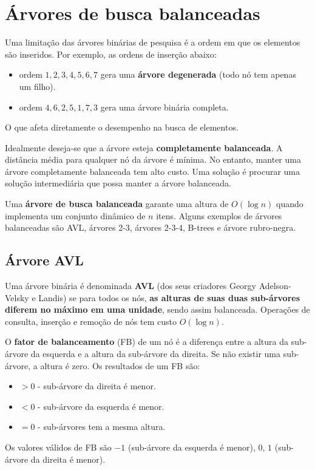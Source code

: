 \section{Árvores de busca balanceadas}

Uma limitação das árvores binárias de pesquisa é a ordem em que os elementos
são inseridos. Por exemplo, as ordens de inserção abaixo:
\begin{itemize}
\item ordem $1, 2, 3, 4, 5, 6, 7$ gera uma {\bf árvore degenerada} (todo nó
tem apenas um filho).
\item ordem $4, 6, 2, 5, 1, 7, 3$ gera uma árvore binária completa.
\end{itemize}
O que afeta diretamente o desempenho na busca de elementos.

Idealmente deseja-se que a árvore esteja {\bf completamente balanceada}.
A distância média para qualquer nó da árvore é mínima.
No entanto, manter uma árvore completamente balanceada tem alto custo.
Uma solução é procurar uma solução intermediária que possa manter a árvore
balanceada.

Uma {\bf árvore de busca balanceada} garante uma altura de $O(\log n)$
quando implementa um conjunto dinâmico de $n$ itens.
Alguns exemplos de árvores balanceadas são AVL, árvores 2-3, árvores 2-3-4,
B-trees e árvore rubro-negra.

\subsection{Árvore AVL}

Uma árvore binária é denominada {\bf AVL} (dos seus criadores Georgy
Adelson-Velsky e Landis) se para todos os nós, {\bf as alturas de suas duas
sub-árvores diferem no máximo em uma unidade}, sendo assim balanceada.
Operações de consulta, inserção e remoção de nós tem custo $O(\log n)$.

O {\bf fator de balanceamento} (FB) de um nó é a diferença entre
a altura da sub-árvore da esquerda e a altura da sub-árvore da direita.
Se não existir uma sub-árvore, a altura é zero.
Os resultados de um FB são:
\begin{itemize}
\item $> 0$ - sub-árvore da direita é menor.
\item $< 0$ - sub-árvore da esquerda é menor.
\item $= 0$ - sub-árvores tem a mesma altura.
\end{itemize}
Os valores válidos de FB são $-1$ (sub-árvore da esquerda é menor), $0$, $1$
(sub-árvore da direita é menor).

